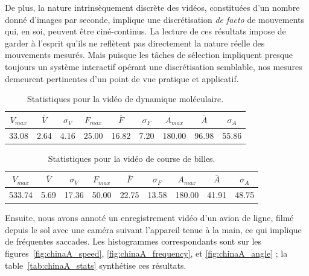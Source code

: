 	De plus, la nature intrinsèquement discrète des vidéos, constituées d'un nombre donné d'images par seconde, implique une discrétisation \emph{de facto} de mouvements qui, en soi, peuvent être ciné-continus. La lecture de ces résultats impose de garder à l'esprit qu'ils ne reflètent pas directement la nature réelle des mouvements mesurés. Mais puisque les tâches de sélection impliquent presque toujours un système interactif opérant une discrétisation semblable, nos mesures demeurent pertinentes d'un point de vue pratique et applicatif.
	
\begin{table}
	\centering
	\begin{tabular}{c c c c c c c c c}
		$V_{max}$	& $\overline{V}$	& $\sigma_{V}$	& $F_{max}$	& $\overline{F}$	& $\sigma_{F}$	& $A_{max}$	& $\overline{A}$	& $\sigma_{A}$	\bigstrut[b] \\ \hline

		33.08		& 2.64				& 4.16			& 25.00		& 16.82				& 7.20			& 180.00	& 96.98				& 55.86			\bigstrut[t] \\
	\end{tabular}
	\caption[Statistiques pour la vidéo de dynamique moléculaire]{Statistiques pour la vidéo de dynamique moléculaire.}
	\label{tab:atom_stats}
\end{table}

\begin{table}
	\centering
	\begin{tabular}{c c c c c c c c c}
		$V_{max}$	& $\overline{V}$	& $\sigma_{V}$	& $F_{max}$	& $\overline{F}$	& $\sigma_{F}$	& $A_{max}$	& $\overline{A}$	& $\sigma_{A}$	\bigstrut[b] \\ \hline

		533.74		& 5.69				& 17.36			& 50.00		& 22.75				& 13.58			& 180.00	& 41.91				& 48.75			\bigstrut[t] \\
	\end{tabular}
	\caption[Statistiques pour la vidéo de course de billes]{Statistiques pour la vidéo de course de billes.}
	\label{tab:bille_stats}
\end{table}

	Ensuite, nous avons annoté un enregistrement vidéo d'un avion de ligne, filmé depuis le sol avec une caméra suivant l'appareil tenue à la main, ce qui implique de fréquentes saccades. Les histogrammes correspondants sont sur les figures~\ref{fig:chinaA_speed}, \ref{fig:chinaA_frequency}, et \ref{fig:chinaA_angle} ; la table~\ref{tab:chinaA_stats} synthétise ces résultats.

